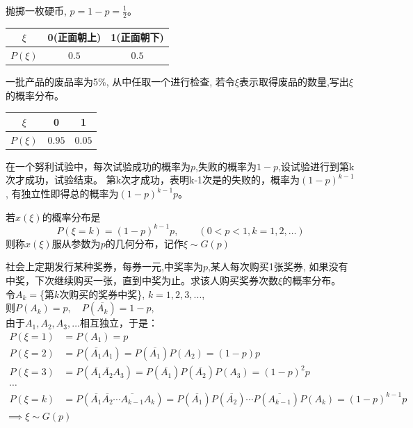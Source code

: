 \begin{frame}
\begin{example}
	抛掷一枚硬币, $p=1-p=\frac{1}{2}$。\\
	\begin{tabular}{|c|c|c|}
		\hline 
		$\xi$ & 0(正面朝上) & 1(正面朝下)\\ 
		\hline 
		$P(\xi)$ & $0.5$ & $0.5$\\ 
		\hline 
	\end{tabular} 
\end{example}

\begin{example}
	一批产品的废品率为5\%, 从中任取一个进行检查, 若令$\xi$表示取得废品的数量,写出$\xi$的概率分布。\\
	\begin{tabular}{|c|c|c|}
		\hline 
		$\xi$ & 0 & 1\\ 
		\hline 
		$P(\xi)$ & $0.95$ & $0.05$\\ 
		\hline 
	\end{tabular} 
\end{example}
\end{frame}

\begin{frame}
在一个努利试验中，每次试验成功的概率为$p$,失败的概率为$1-p$,设试验进行到第k次才成功，试验结束。
第k次才成功，表明k-1次是的失败的，概率为$(1-p)^{k-1}$, 有独立性即得总的概率为$(1-p)^{k-1}p$。

\begin{definition}[几何分布]
	若$x(\xi)$的概率分布是
	\[P(\xi=k)=(1-p)^{k-1}p,\qquad (0<p<1,k=1,2,\dots)\]
	则称$x(\xi)$服从参数为$p$的几何分布，记作$\xi\sim G(p)$
\end{definition}
\end{frame}

\begin{frame}
\begin{example}
	社会上定期发行某种奖券，每券一元,中奖率为$p$,某人每次购买1张奖券, 如果没有中奖，下次继续购买一张，直到中奖为止。求该人购买奖券次数$\xi$的概率分布。\\
	令$A_k=$\{第$k$次购买的奖券中奖\}, $k=1,2,3,...$, \\
	则$P(A_k)=p,\quad P(\overline{A_k})=1-p$, \\
	由于$A_1,A_2,A_3,\dots$相互独立，于是：
	\begin{align*}
	P(\xi=1)&=P(A_1)=p\\
	P(\xi=2)&=P(\overline{A_1}A_1)=P(\overline{A_1})P(A_2)=(1-p)p\\
	P(\xi=3)&=P(\overline{A_1}\overline{A_2}A_3)=P(\overline{A_1})P(\overline{A_2})P(A_3)=(1-p)^{2}p\\
	\cdots\\
	P(\xi=k)&=P(\overline{A_1}\overline{A_2}\cdots\overline{A_{k-1}}A_k)=P(\overline{A_1})P(\overline{A_2})\cdots P(\overline{A_{k-1}})P(A_k)=(1-p)^{k-1}p
	\end{align*}
	$\implies \xi\sim G(p)$
\end{example}
\end{frame}

